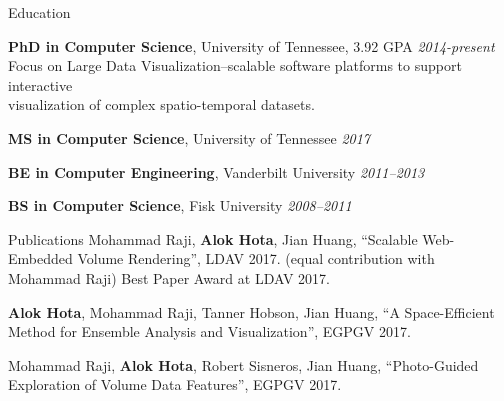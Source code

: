 \documentclass{resume} %
\begin{document}

\begin{rSection}{Education}

{{\bf PhD in Computer Science}, University of Tennessee, 3.92 GPA} \hfill {\em 2014-present} \\ 
Focus on Large Data Visualization--scalable software platforms to support interactive \\
visualization of complex spatio-temporal datasets.

{{\bf MS in Computer Science}, University of Tennessee} \hfill {\em 2017}

{{\bf BE in Computer Engineering}, Vanderbilt University} \hfill {\em 2011--2013}

{{\bf BS in Computer Science}, Fisk University} \hfill {\em 2008--2011}

\end{rSection}


\begin{rSection}{Publications}
    Mohammad Raji, \textbf{Alok Hota}, Jian Huang, ``Scalable Web-Embedded Volume Rendering'', LDAV 2017. (equal contribution with Mohammad Raji)
    Best Paper Award at LDAV 2017.
    
    \textbf{Alok Hota}, Mohammad Raji, Tanner Hobson, Jian Huang, ``A Space-Efficient Method for Ensemble Analysis and Visualization'', EGPGV 2017.
    
    Mohammad Raji, \textbf{Alok Hota}, Robert Sisneros, Jian Huang, ``Photo-Guided Exploration of Volume Data Features'', EGPGV 2017.
\end{rSection}

\end{document}
